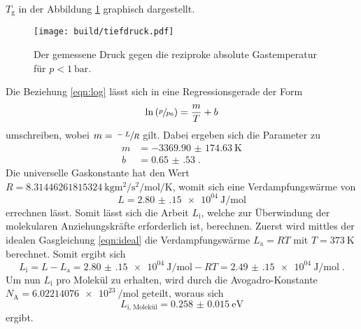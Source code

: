 $T_\text{g}$ in der Abbildung \ref{fig:tiefdruck} graphisch dargestellt. 
\begin{figure}
    \centering
    \caption{Der gemessene Druck gegen die reziproke absolute Gastemperatur für $p < \SI{1}{\bar}$.}
    \label{fig:tiefdruck}
    \texttt{[image: build/tiefdruck.pdf]}
\end{figure}
Die Beziehung \eqref{eqn:log} lässt sich in eine Regressionsgerade der Form 
\begin{equation*}
    \ln \left ( \sfrac{p}{p_0} \right) = \frac{m}{T}+b
\end{equation*}
umschreiben, wobei $m=\sfrac{-L}{R}$ gilt.
Dabei ergeben sich die Parameter zu 
\begin{align*}
    m &= \SI{-3369.90(17463)}{\kelvin}\\
    b &= \SI{0.65(53)} \; \text{.}
\end{align*}
Die universelle Gaskonstante hat den Wert $R = \SI{8.31446261815324}{\kilo\gram\metre\squared\per\second\squared\per\mole\per\kelvin}$\cite{gasconstant}, womit sich
eine Verdampfungswärme von 
\begin{equation*}
    L = \SI{2.80(15)e04}{\joule\per\mole}
\end{equation*}
errechnen lässt.
Somit lässt sich die Arbeit $L_\text{i}$, welche zur Überwindung der molekularen Anziehungskräfte erforderlich ist, berechnen.
Zuerst wird mittles der idealen Gasgleichung \eqref{eqn:ideal} die Verdampfungswärme $L_\text{a} = RT$ mit $T = \SI{373}{\kelvin}$ berechnet.
Somit ergibt sich 
\begin{equation*}
    L_\text{i} = L - L_\text{a} = \SI{2.80(15)e04}{\joule\per\mole} - RT = \SI{2.49(15)e04}{\joule\per\mole} \; \text{.}
\end{equation*}
Um nun $L_\text{i}$ pro Molekül zu erhalten, wird durch die Avogadro-Konstante $N_\text{A} = \SI{6.02214076e23}{\per\mole}$\cite{avogadro} geteilt,
woraus sich 
\begin{equation*}
    L_\text{i, Molekül} = \SI{0.258(15)}{\electronvolt}
\end{equation*}
ergibt.
